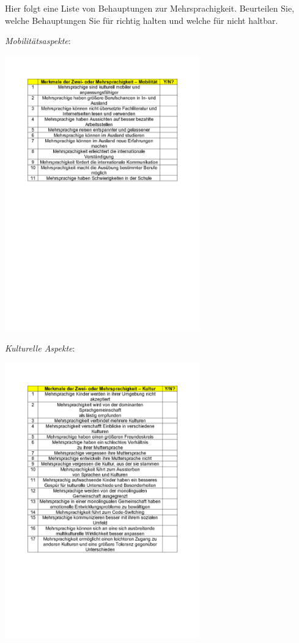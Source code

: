 \documentclass[
  letterpaper,
]{scrbook}
\begin{document}
Hier folgt eine Liste von Behauptungen zur Mehrsprachigkeit. Beurteilen
Sie, welche Behauptungen Sie für richtig halten und welche für nicht
haltbar.

\emph{Mobilitätsaspekte}:

\includegraphics[width=3.31in,height=\textheight]{./pictures/Mehrsprachigkeit_Behauptungen_Page1.png}

\emph{Kulturelle Aspekte}:

\includegraphics[width=3.31in,height=\textheight]{./pictures/Mehrsprachigkeit_Behauptungen_Page2.png}
\end{document}
